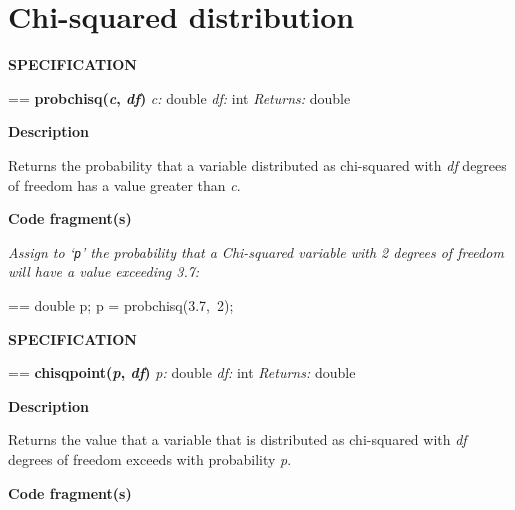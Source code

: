 \documentclass{book}
\makeatletter
\newcommand\Texinfocommandstyletextvar[1]{{\normalfont{}\textsl{#1}}}%
\newenvironment{Texinfopreformatted}{%
  \par\GNUTobeylines\obeyspaces\frenchspacing\parskip=\z@\parindent=\z@}{}
{\catcode`\^^M=13 \gdef\GNUTobeylines{\catcode`\^^M=13 \def^^M{\null\par}}}
\newenvironment{Texinfoindented}{\begin{list}{}{}\item\relax}{\end{list}}
\renewcommand{\_}{\Texinfounderscore\discretionary{}{}{}}
\makeatother
\begin{document}
\section{{Chi-squared distribution}}
\label{anchor:Chi_002dsquared-distribution}%
%

\noindent{}\textbf{SPECIFICATION}
\begin{Texinfoindented}
\begin{Texinfopreformatted}%
\textbf{probchisq(\Texinfocommandstyletextvar{c}, \Texinfocommandstyletextvar{df})}
\Texinfocommandstyletextvar{c:} double
\Texinfocommandstyletextvar{df:} int
\Texinfocommandstyletextvar{Returns:} double
\end{Texinfopreformatted}
\end{Texinfoindented}

\noindent{}\textbf{Description}

Returns the probability that a variable distributed as chi-squared with
\Texinfocommandstyletextvar{df} degrees of freedom has a value greater than \Texinfocommandstyletextvar{c}.

\noindent{}\textbf{Code fragment(s)}

\emph{Assign to `\texttt{p}' the probability that a Chi-squared variable with 2
degrees of freedom will have a value exceeding 3.7:}
\begin{Texinfoindented}
\begin{Texinfopreformatted}%
\ttfamily double p;
p = probchisq(3.7,\ 2);
\end{Texinfopreformatted}
\end{Texinfoindented}

\noindent{}\textbf{SPECIFICATION}
\begin{Texinfoindented}
\begin{Texinfopreformatted}%
\textbf{chisqpoint(\Texinfocommandstyletextvar{p}, \Texinfocommandstyletextvar{df})}
\Texinfocommandstyletextvar{p:} double
\Texinfocommandstyletextvar{df:} int
\Texinfocommandstyletextvar{Returns:} double
\end{Texinfopreformatted}
\end{Texinfoindented}

\noindent{}\textbf{Description}

Returns the value that a variable that is distributed as chi-squared with
\Texinfocommandstyletextvar{df} degrees of freedom exceeds with probability \Texinfocommandstyletextvar{p}.

\noindent{}\textbf{Code fragment(s)}
\end{document}
